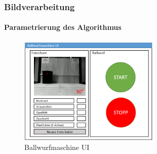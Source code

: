 \begin{frame}
	\frametitle{Bildverarbeitung\hfill{}\footnotesize \group}
	\framesubtitle{Parametrierung des Algorithmus}
	
	\begin{figure}
		\centering
		\includegraphics[width=0.6\textwidth]{../../fig/fotoshoot-configurator.png}
		\caption{Ballwurfmaschine UI}
	\end{figure}
	
	
\end{frame}
